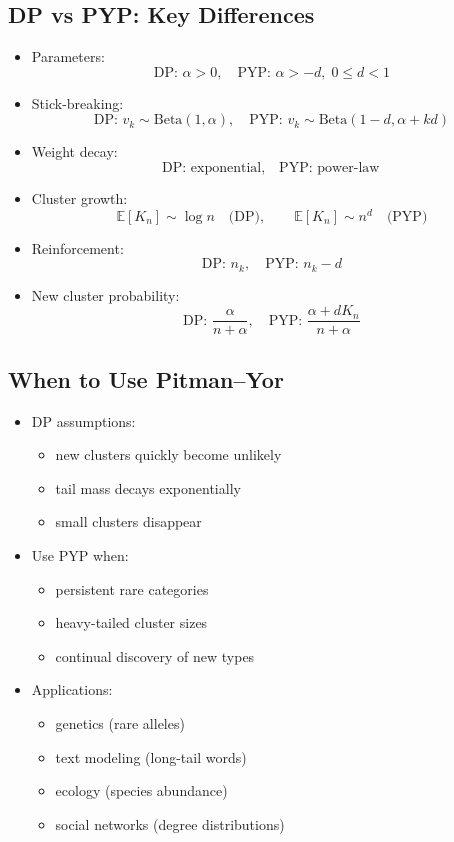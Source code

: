 \documentclass[12pt,oneside]{book}
\numberwithin{equation}{section}
\theoremstyle{definition}
\theoremstyle{plain}
\theoremstyle{remark}
\begin{document}
\subsection*{DP vs PYP: Key Differences}

\begin{itemize}
\item Parameters:
\[
\text{DP: } \alpha > 0, \quad \text{PYP: } \alpha > -d,\; 0 \le d < 1
\]

\item Stick-breaking:
\[
\text{DP: } v_k \sim \text{Beta}(1,\alpha), \quad
\text{PYP: } v_k \sim \text{Beta}(1-d,\alpha+kd)
\]

\item Weight decay:
\[
\text{DP: exponential}, \quad \text{PYP: power-law}
\]

\item Cluster growth:
\[
\mathbb{E}[K_n] \sim \log n \quad \text{(DP)}, \qquad \mathbb{E}[K_n] \sim n^d \quad \text{(PYP)}
\]

\item Reinforcement:
\[
\text{DP: } n_k, \quad \text{PYP: } n_k - d
\]

\item New cluster probability:
\[
\text{DP: } \frac{\alpha}{n+\alpha}, \quad
\text{PYP: } \frac{\alpha + dK_n}{n+\alpha}
\]
\end{itemize}

\subsection*{When to Use Pitman--Yor}

\begin{itemize}
\item DP assumptions:
\begin{itemize}
\item new clusters quickly become unlikely
\item tail mass decays exponentially
\item small clusters disappear
\end{itemize}

\item Use PYP when:
\begin{itemize}
\item persistent rare categories
\item heavy-tailed cluster sizes
\item continual discovery of new types
\end{itemize}

\item Applications:
\begin{itemize}
\item genetics (rare alleles)
\item text modeling (long-tail words)
\item ecology (species abundance)
\item social networks (degree distributions)
\end{itemize}
\end{itemize}
\end{document}
